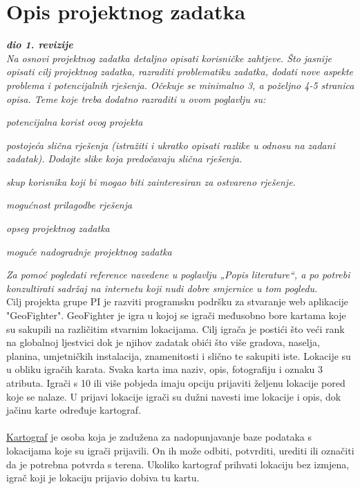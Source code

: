 \chapter{Opis projektnog zadatka}
		
		\textbf{\textit{dio 1. revizije}}\\
		
		\textit{Na osnovi projektnog zadatka detaljno opisati korisničke zahtjeve. Što jasnije opisati cilj projektnog zadatka, razraditi problematiku zadatka, dodati nove aspekte problema i potencijalnih rješenja. Očekuje se minimalno 3, a poželjno 4-5 stranica opisa.	Teme koje treba dodatno razraditi u ovom poglavlju su:}
		\begin{packed_item}
			\item \textit{potencijalna korist ovog projekta}
			\item \textit{postojeća slična rješenja (istražiti i ukratko opisati razlike u odnosu na zadani zadatak). Dodajte slike koja predočavaju slična rješenja.}
			\item \textit{skup korisnika koji bi mogao biti zainteresiran za ostvareno rješenje.}
			\item \textit{mogućnost prilagodbe rješenja }
			\item \textit{opseg projektnog zadatka}
			\item \textit{moguće nadogradnje projektnog zadatka}
		\end{packed_item}
		
		\textit{Za pomoć pogledati reference navedene u poglavlju „Popis literature“, a po potrebi konzultirati sadržaj na internetu koji nudi dobre smjernice u tom pogledu.}\\
		
		\textnormal{Cilj projekta grupe PI je razviti programsku podršku za stvaranje web aplikacije "GeoFighter".  GeoFighter je igra u kojoj se igrači međusobno bore kartama koje su sakupili na različitim stvarnim lokacijama. Cilj igrača je postići što veći rank na globalnoj ljestvici dok je njihov zadatak obići što više  gradova, naselja, planina, umjetničkih instalacija, znamenitosti i slično te sakupiti iste. Lokacije su u obliku igračih karata. Svaka karta ima naziv,  opis, fotografiju i oznaku 3 atributa. Igrači s 10 ili više pobjeda imaju opciju prijaviti željenu lokacije pored koje se nalaze. U prijavi lokacije igrači su dužni navesti ime lokacije i opis, dok jačinu karte određuje kartograf. \\\\ \underline{Kartograf} je osoba koja je zadužena za nadopunjavanje baze podataka s lokacijama koje su igrači prijavili. On ih može odbiti, potvrditi, urediti ili označiti da je potrebna potvrda s terena. Ukoliko kartograf prihvati lokaciju bez izmjena, igrač koji je lokaciju  prijavio dobiva tu kartu.}\\
		
